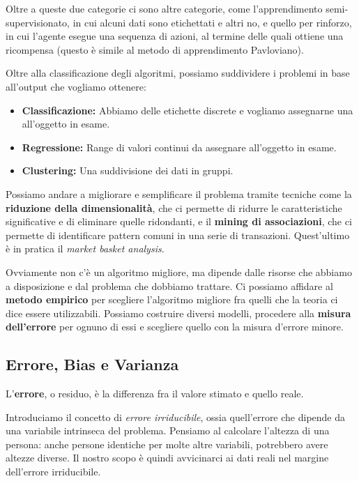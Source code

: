     Oltre a queste due categorie ci sono altre categorie, come l'apprendimento semi-supervisionato, in cui alcuni dati sono etichettati e altri no, e quello per rinforzo, in cui l'agente esegue una sequenza di azioni, al termine delle quali ottiene una ricompensa (questo è simile al metodo di apprendimento Pavloviano).
    
    Oltre alla classificazione degli algoritmi, possiamo suddividere i problemi in base all'output che vogliamo ottenere:
    \begin{itemize}
        \item \textbf{Classificazione:} Abbiamo delle etichette discrete e vogliamo assegnarne una all'oggetto in esame.
        
        \item \textbf{Regressione:} Range di valori continui da assegnare all'oggetto in esame.
        
        \item \textbf{Clustering:} Una suddivisione dei dati in gruppi.
    \end{itemize}
    
    Possiamo andare a migliorare e semplificare il problema tramite tecniche come la \textbf{riduzione della dimensionalità}, che ci permette di ridurre le caratteristiche significative e di eliminare quelle ridondanti, e il \textbf{mining di associazioni}, che ci permette di identificare pattern comuni in una serie di transazioni. Quest'ultimo è in pratica il \textit{market basket analysis}.
    
    Ovviamente non c'è un algoritmo migliore, ma dipende dalle risorse che abbiamo a disposizione e dal problema che dobbiamo trattare. Ci possiamo affidare al \textbf{metodo empirico} per scegliere l'algoritmo migliore fra quelli che la teoria ci dice essere utilizzabili. Possiamo costruire diversi modelli, procedere alla \textbf{misura dell'errore} per ognuno di essi e scegliere quello con la misura d'errore minore.
    
    \subsection{Errore, Bias e Varianza}
        L'\textbf{errore}, o residuo, è la differenza fra il valore stimato e quello reale.
        
        Introduciamo il concetto di \textit{errore irriducibile}, ossia quell'errore che dipende da una variabile intrinseca del problema. Pensiamo al calcolare l'altezza di una persona: anche persone identiche per molte altre variabili, potrebbero avere altezze diverse. Il nostro scopo è quindi avvicinarci ai dati reali nel margine dell'errore irriducibile.
        
